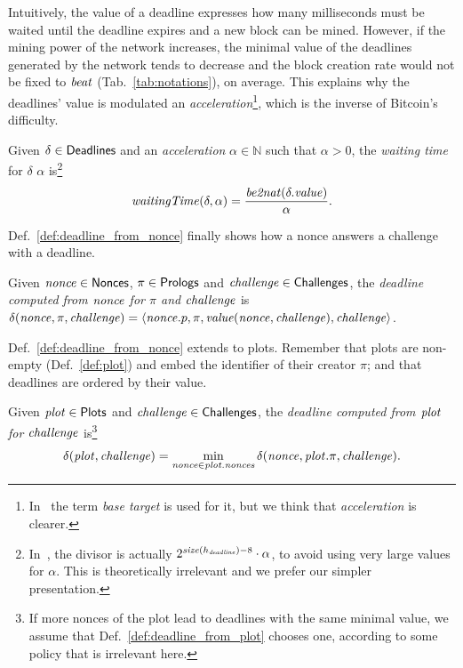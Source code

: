 %
Intuitively, the value of a deadline expresses how many milliseconds
must be waited until the deadline expires and a new block can be mined.
However, if the mining power of the network increases, the minimal value of the deadlines
generated by the network tends to decrease and the block creation rate would not be
fixed to ${\mathit{beat}}$ (Tab.~\ref{tab:notations}), on average.
This explains why the deadlines' value is modulated \wrt an
\emph{acceleration}\footnote{In~\cite{SignumPlotting} the term
\emph{base target} is used for it, but we think that \emph{acceleration} is clearer.},
which is the inverse of Bitcoin's difficulty.
%
\begin{definition}\label{def:deadline_waiting_time}
  Given $\delta\in{\mathsf{Deadlines}}$ and an \emph{acceleration}
  $\alpha\in\mathbb{N}$ such that $\alpha>0$, the
  \emph{waiting time} for $\delta$ \wrt $\alpha$ is\footnote{
  In~\cite{SignumPlotting}, the divisor is actually
  $2^{{\mathit{size}}(h_{\mathit{deadline}})-8}\cdot\alpha$, to avoid using very large values for
  $\alpha$. This is theoretically irrelevant and we prefer our simpler presentation.
  }
  \[
  {\mathit{waitingTime}}(\delta,\alpha)
  =\frac{{\mathit{be2nat}}(\delta.\mathit{value})}{\alpha}.
  \]
\end{definition}
%
Def.~\ref{def:deadline_from_nonce} finally shows how a nonce answers a challenge with a deadline.
%
\begin{definition}[$\delta(\nonce,\pi,\challenge)$]\label{def:deadline_from_nonce}
  Given ${\mathit{nonce}}\in{\mathsf{Nonces}}$, $\pi\in{\mathsf{Prologs}}$ and ${\mathit{challenge}}\in{\mathsf{Challenges}}$, the
  \emph{deadline computed from ${\mathit{nonce}}$ for $\pi$ and ${\mathit{challenge}}$} is
  $\delta({\mathit{nonce}},\pi,{\mathit{challenge}})=\langle{\mathit{nonce}}.p,\pi,\mathit{value}({\mathit{nonce}},{\mathit{challenge}}),{\mathit{challenge}}\rangle$.
\end{definition}
%
Def.~\ref{def:deadline_from_nonce} extends to plots. Remember that plots are non-empty
(Def.~\ref{def:plot}) and embed the identifier of their creator $\pi$;
and that deadlines are ordered by their value.
%
\begin{definition}[$\deadline(\plot,\challenge)$]\label{def:deadline_from_plot}
  Given ${\mathit{plot}}\in{\mathsf{Plots}}$ and ${\mathit{challenge}}\in{\mathsf{Challenges}}$, the \emph{deadline computed
  from ${\mathit{plot}}$ for ${\mathit{challenge}}$} is\footnote{If more nonces of the plot lead to deadlines
  with the same minimal value, we assume that Def.~\ref{def:deadline_from_plot} chooses one,
  according to some policy that is irrelevant here.}
  \[
  \delta({\mathit{plot}},{\mathit{challenge}})=\min\limits_{{\mathit{nonce}}\in{\mathit{plot}}.{\mathit{nonces}}}\delta({\mathit{nonce}},{\mathit{plot}}.\pi,{\mathit{challenge}}).
  \]
\end{definition}
